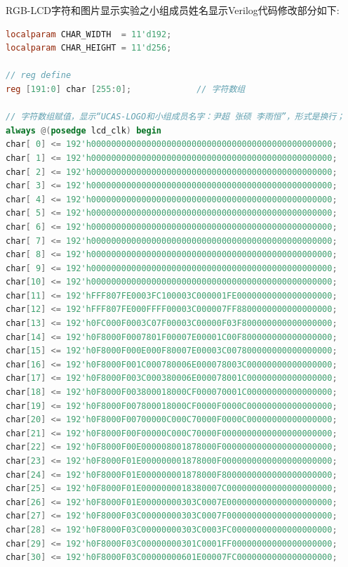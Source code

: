 \documentclass[UTF8]{article}
\theoremstyle{MyLineTheoremStyle} %
\theoremstyle{MyBlockTheoremStyle} %
\theoremstyle{MySubsubsectionStyle} %
\begin{document}
RGB-LCD字符和图片显示实验之小组成员姓名显示Verilog代码修改部分如下:
\begin{lstlisting}[language=Verilog, caption={小组成员姓名显示Verilog代码修改部分}, label={lst:verilog_code2}]
localparam CHAR_WIDTH  = 11'd192;
localparam CHAR_HEIGHT = 11'd256;

// reg define
reg [191:0] char [255:0];             // 字符数组

// 字符数组赋值，显示“UCAS-LOGO和小组成员名字：尹超 张硕 李雨恒”，形式是换行；
always @(posedge lcd_clk) begin
char[ 0] <= 192'h000000000000000000000000000000000000000000000000;
char[ 1] <= 192'h000000000000000000000000000000000000000000000000;
char[ 2] <= 192'h000000000000000000000000000000000000000000000000;
char[ 3] <= 192'h000000000000000000000000000000000000000000000000;
char[ 4] <= 192'h000000000000000000000000000000000000000000000000;
char[ 5] <= 192'h000000000000000000000000000000000000000000000000;
char[ 6] <= 192'h000000000000000000000000000000000000000000000000;
char[ 7] <= 192'h000000000000000000000000000000000000000000000000;
char[ 8] <= 192'h000000000000000000000000000000000000000000000000;
char[ 9] <= 192'h000000000000000000000000000000000000000000000000;
char[10] <= 192'h000000000000000000000000000000000000000000000000;
char[11] <= 192'hFFF807FE0003FC100003C000001FE0000000000000000000;
char[12] <= 192'hFFF807FE000FFFF00003C000007FF8800000000000000000;
char[13] <= 192'h0FC000F0003C07F00003C00000F03F800000000000000000;
char[14] <= 192'h0F8000F0007801F00007E00001C00F800000000000000000;
char[15] <= 192'h0F8000F000E000F80007E00003C007800000000000000000;
char[16] <= 192'h0F8000F001C000780006E000078003C00000000000000000;
char[17] <= 192'h0F8000F003C000380006E000078001C00000000000000000;
char[18] <= 192'h0F8000F003800018000CF000070001C00000000000000000;
char[19] <= 192'h0F8000F007800018000CF0000F0000C00000000000000000;
char[20] <= 192'h0F8000F00700000C000C70000F0000C00000000000000000;
char[21] <= 192'h0F8000F00F00000C000C70000F0000000000000000000000;
char[22] <= 192'h0F8000F00E000008001878000F0000000000000000000000;
char[23] <= 192'h0F8000F01E000000001878000F0000000000000000000000;
char[24] <= 192'h0F8000F01E000000001878000F8000000000000000000000;
char[25] <= 192'h0F8000F01E0000000018380007C000000000000000000000;
char[26] <= 192'h0F8000F01E00000000303C0007E000000000000000000000;
char[27] <= 192'h0F8000F03C00000000303C0007F000000000000000000000;
char[28] <= 192'h0F8000F03C00000000303C0003FC00000000000000000000;
char[29] <= 192'h0F8000F03C00000000301C0001FF00000000000000000000;
char[30] <= 192'h0F8000F03C00000000601E00007FC0000000000000000000;

\end{lstlisting}
\end{document}
